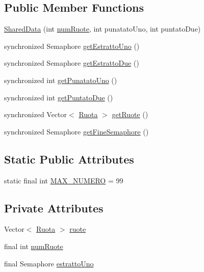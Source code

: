 \subsection*{Public Member Functions}
\begin{DoxyCompactItemize}
\item 
\mbox{\hyperlink{classmain_1_1_shared_data_a7c3fcf7e88661c8f19dc4f1bef3b1f1c}{Shared\+Data}} (int \mbox{\hyperlink{classmain_1_1_shared_data_afd761d5f372b32a47d35514239540df6}{num\+Ruote}}, int punatato\+Uno, int puntato\+Due)
\item 
synchronized Semaphore \mbox{\hyperlink{classmain_1_1_shared_data_a113b8bd4e0520f7610c30c826d177898}{get\+Estratto\+Uno}} ()
\item 
synchronized Semaphore \mbox{\hyperlink{classmain_1_1_shared_data_a03babbf5685e678be2baebb70af3fc4e}{get\+Estratto\+Due}} ()
\item 
synchronized int \mbox{\hyperlink{classmain_1_1_shared_data_a61e4168cef037c5305a703af0c3e5ce5}{get\+Punatato\+Uno}} ()
\item 
synchronized int \mbox{\hyperlink{classmain_1_1_shared_data_afe476c2ad5a76e2d77871f0cfe94b1fd}{get\+Puntato\+Due}} ()
\item 
synchronized Vector$<$ \mbox{\hyperlink{classmain_1_1_ruota}{Ruota}} $>$ \mbox{\hyperlink{classmain_1_1_shared_data_aa492c5b4f3fb55eb33f9c79b7b484d41}{get\+Ruote}} ()
\item 
synchronized Semaphore \mbox{\hyperlink{classmain_1_1_shared_data_ab9a75de14be42bfeb3654d44f09b20bf}{get\+Fine\+Semaphore}} ()
\end{DoxyCompactItemize}
\subsection*{Static Public Attributes}
\begin{DoxyCompactItemize}
\item 
static final int \mbox{\hyperlink{classmain_1_1_shared_data_af9e82eed5f04a857c2749dae6956ddc1}{M\+A\+X\+\_\+\+N\+U\+M\+E\+RO}} = 99
\end{DoxyCompactItemize}
\subsection*{Private Attributes}
\begin{DoxyCompactItemize}
\item 
Vector$<$ \mbox{\hyperlink{classmain_1_1_ruota}{Ruota}} $>$ \mbox{\hyperlink{classmain_1_1_shared_data_a3336af22f48845590e6b9cace9d82ce1}{ruote}}
\item 
final int \mbox{\hyperlink{classmain_1_1_shared_data_afd761d5f372b32a47d35514239540df6}{num\+Ruote}}
\item 
final Semaphore \mbox{\hyperlink{classmain_1_1_shared_data_a63712f23e96673948c3fd3c48b64d05b}{estratto\+Uno}}
\end{DoxyCompactItemize}


